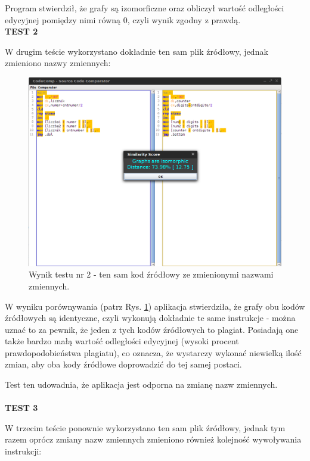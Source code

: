 \documentclass[a4paper,12pt,twoside]{article}
\begin{document}
Program stwierdził, że grafy są izomorficzne oraz obliczył wartość odległości edycyjnej pomiędzy nimi równą 0, czyli wynik zgodny z prawdą.
\\
\textbf{TEST 2}

W drugim teście wykorzystano dokładnie ten sam plik źródłowy, jednak zmieniono nazwy zmiennych:
\\
\begin{figure}[here]
\centering
\includegraphics[scale=0.4]{gfx/test2.png}
\caption{Wynik testu nr 2 - ten sam kod źródłowy ze zmienionymi nazwami zmiennych.}
\label{fig:test2}
\end{figure}

W wyniku porównywania (patrz Rys. \ref{fig:test2}) aplikacja stwierdziła, że grafy obu kodów źródłowych są identyczne, czyli wykonują dokładnie te same instrukcje - można uznać to za pewnik, że jeden z tych kodów źródłowych to plagiat. Posiadają one także bardzo małą wartość odległości edycyjnej (wysoki procent prawdopodobieństwa plagiatu), co oznacza, że wystarczy wykonać niewielką ilość zmian, aby oba kody źródłowe doprowadzić do tej samej postaci.

Test ten udowadnia, że aplikacja jest odporna na zmianę nazw zmiennych.
\\
\pagebreak
\\
\textbf{TEST 3}

W trzecim teście ponownie wykorzystano ten sam plik źródłowy, jednak tym razem oprócz zmiany nazw zmiennych zmieniono również kolejność wywoływania instrukcji:
\end{document}
